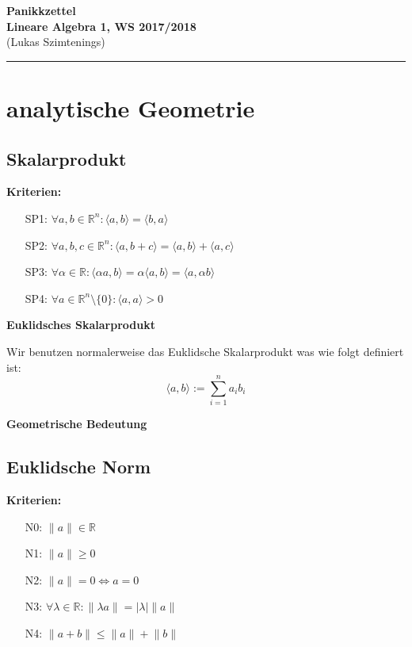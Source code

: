 \documentclass[12pt,a4paper]{article}
\begin{document}
\textbf{Panikkzettel} \\ 
\textbf{Lineare Algebra 1, WS 2017/2018} \\
{\scriptsize (Lukas Szimtenings)}
\hrule 

\bigskip

\tableofcontents
\pagebreak
\section{analytische Geometrie}

\subsection{Skalarprodukt}
\textbf{Kriterien:}

\begin{itemize}
\item [SP1:] $\forall a,b \in \mathbb{R}^n: \langle a,b\rangle =\langle b,a\rangle $
\item [SP2:] $\forall a,b,c \in \mathbb{R}^n: \langle a,b+c\rangle =\langle a,b\rangle  + \langle a,c\rangle $
\item [SP3:] $\forall \alpha \in \mathbb{R}: \langle \alpha a,b\rangle =\alpha\langle a,b\rangle =\langle a,\alpha b\rangle $
\item [SP4:] $\forall a\in\mathbb{R}^n\setminus \{0\}:\langle a,a\rangle >0$
\end{itemize}
\textbf{Euklidsches Skalarprodukt}

Wir benutzen normalerweise das Euklidsche Skalarprodukt was wie folgt definiert ist:
\[\langle a,b\rangle:=\sum_{i=1}^n a_ib_i\]

\textbf{Geometrische Bedeutung}

\subsection{Euklidsche Norm}
\textbf{Kriterien:}

\begin{itemize}
\item [N0:] $\lVert a\rVert \in \mathbb{R}$
\item [N1:] $\lVert a\rVert \geq 0$
\item [N2:] $\lVert a\rVert = 0 \Leftrightarrow a=0$
\item [N3:] $\forall\lambda\in\mathbb{R}:\lVert\lambda a\rVert = |\lambda |\lVert a\rVert$
\item [N4:] $\lVert a+b\rVert\leq\lVert a\rVert +\lVert b\rVert$
\end{itemize}
\end{document}
